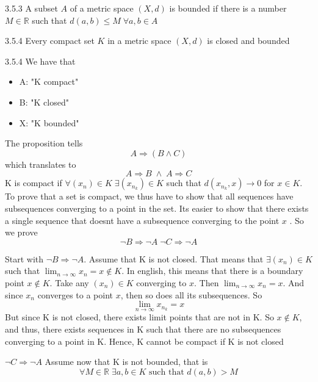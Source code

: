 \documentclass[a4paper,norsk]{article}
\renewcommand{\leq}{\leqslant}
\begin{document}
\begin{definitionbox}{3.5.3}{}
A subset $ A $ of a metric space $ \left( X, d \right)  $ is bounded if there is a number $ M \in \mathbb{R} $ such that $ d \left( a, b \right) \leq M \; \forall  a,b \in A $
\end{definitionbox}

\begin{propositionbox}{3.5.4}{}
Every compact set $ K $ in a metric space $ \left( X, d \right)  $ is closed and bounded

\begin{proofbox}{3.5.4}{}
  We have that 
  \begin{itemize}
    \item A: "K compact"
    \item B: "K closed"
    \item X: "K bounded"
  \end{itemize}
  The proposition tells 
  \[
      A \Rightarrow \left( B \wedge C \right) 
  \]
  which translates to 
  \[
      A \Rightarrow B \; \wedge \; A \Rightarrow C
  \]
  K is compact if $ \forall \left( x_n \right) \in  K \; \exists \left( x_{n_k} \right) \in K $ such that $ d \left( x_{n_k}, x \right) \rightarrow 0  $ for $ x \in K $. To prove that a set is compact, we thus have to show that all sequences have subsequences converging to a point in the set. Its easier to show that there exists a single sequence that doesnt have a subsequence converging to the point $ x $ . So we prove
  \[
      \neg B \Rightarrow \neg A \; \neg C \Rightarrow \neg A
  \]

  Start with $ \neg B \Rightarrow \neg A $. Assume that K is not closed. That means that $ \exists \left( x_n \right) \in  K $ such that $ \lim_{n \to \infty} x_n = x \notin K $. In english, this means that there is a boundary point $ x \notin K $. Take any $ \left( x_n \right) \in K  $ converging to $ x $. Then $ \lim_{n \to \infty} x_n = x $. And since $ x_n $ converges to a point $ x $, then so does all its subsequences. So 
  \[
      \lim_{n   \to \infty} x_{n_k} = x 
  \]
  But since K is not closed, there exists limit points that are not in K. So $ x \notin K $, and thus, there exists sequences in K such that there are no subsequences converging to a point in K. Hence, K cannot be compact if K is not closed


  $ \neg C \Rightarrow  \neg A $ 
  Assume now that K is not bounded, that is
  \[
      \forall M \in \mathbb{R} \; \exists a, b \in K \text{ such that } d \left( a, b \right) > M
  \]
  

\end{proofbox}
\end{propositionbox}
\end{document}
